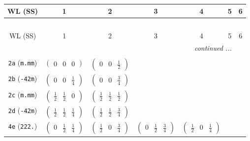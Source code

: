 \documentclass[fleqn,9pt,landscape]{jsarticle}
\begin{document}
\begin{center}
\renewcommand{\arraystretch}{1.2}
\begin{longtable}{ccccccc}
 \hline \hline
WL (SS) & 1 & 2 & 3 & 4 & 5 & 6 \\ \hline \endfirsthead

\multicolumn{6}{l}{\tablename\ \thetable{}} \\
 \hline \hline
WL (SS) & 1 & 2 & 3 & 4 & 5 & 6 \\ \hline \endhead

 \hline \hline
\multicolumn{6}{r}{\footnotesize\it continued ...} \\ \endfoot

 \hline \hline
\multicolumn{6}{r}{} \\ \endlastfoot

{\tt 2a} ({\tt m.mm}) & $ \begin{pmatrix} 0 & 0 & 0 \end{pmatrix} $ & $ \begin{pmatrix} 0 & 0 & \frac{1}{2} \end{pmatrix} $ & $  $ & $  $ & $  $ & $  $ \\ \hline
{\tt 2b} ({\tt -42m}) & $ \begin{pmatrix} 0 & 0 & \frac{1}{4} \end{pmatrix} $ & $ \begin{pmatrix} 0 & 0 & \frac{3}{4} \end{pmatrix} $ & $  $ & $  $ & $  $ & $  $ \\ \hline
{\tt 2c} ({\tt m.mm}) & $ \begin{pmatrix} \frac{1}{2} & \frac{1}{2} & 0 \end{pmatrix} $ & $ \begin{pmatrix} \frac{1}{2} & \frac{1}{2} & \frac{1}{2} \end{pmatrix} $ & $  $ & $  $ & $  $ & $  $ \\ \hline
{\tt 2d} ({\tt -42m}) & $ \begin{pmatrix} \frac{1}{2} & \frac{1}{2} & \frac{1}{4} \end{pmatrix} $ & $ \begin{pmatrix} \frac{1}{2} & \frac{1}{2} & \frac{3}{4} \end{pmatrix} $ & $  $ & $  $ & $  $ & $  $ \\ \hline
{\tt 4e} ({\tt 222.}) & $ \begin{pmatrix} 0 & \frac{1}{2} & \frac{1}{4} \end{pmatrix} $ & $ \begin{pmatrix} \frac{1}{2} & 0 & \frac{3}{4} \end{pmatrix} $ & $ \begin{pmatrix} 0 & \frac{1}{2} & \frac{3}{4} \end{pmatrix} $ & $ \begin{pmatrix} \frac{1}{2} & 0 & \frac{1}{4} \end{pmatrix} $ & $  $ & $  $ \\ \hline

\end{longtable}
\end{center}
\end{document}
